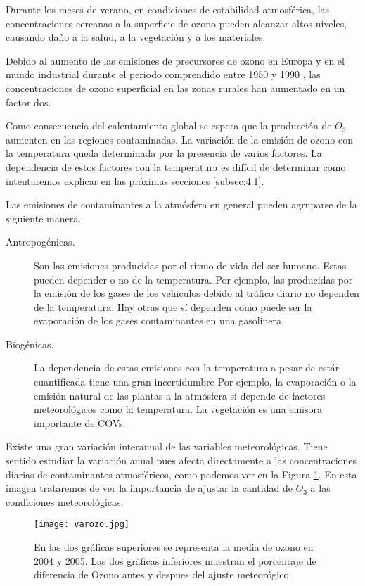 \documentclass[12pt]{article}
\begin{document}
Durante los meses de verano, en condiciones de estabilidad atmosférica, las concentraciones cercanas a la superficie de ozono pueden alcanzar altos niveles, causando daño a la salud, a la vegetación  y a los materiales.

 Debido al  aumento  de las emisiones de  precursores de ozono en Europa y en el mundo industrial durante el periodo comprendido entre 1950 y 1990 \citep{staehelin1994}, las concentraciones de ozono superficial en las zonas rurales han aumentado en un factor dos.
 



Como consecuencia del calentamiento global se espera que la producción de $O_3$ aumenten en las regiones contaminadas. La variación de la emisión de ozono con la temperatura queda determinada por la presencia de  varios factores. La dependencia de estos factores con la temperatura es difícil de determinar como intentaremos explicar en las próximas secciones \ref{subsec:4.1}.


Las emisiones de contaminantes a la atmósfera en general pueden agruparse de la siguiente manera.
\begin{description}
\item[Antropogénicas.] Son las emisiones producidas por el ritmo de vida del ser humano. Estas pueden depender o no de la temperatura. Por ejemplo, las producidas por la emisión de los gases de los vehiculos debido al tráfico diario no dependen de la temperatura. Hay otras que sí dependen como puede ser la evaporación de los gases contaminantes en una gasolinera.
\item[ Biogénicas.] La dependencia de estas emisiones con  la temperatura  a pesar de   estár cuantificada tiene una gran incertidumbre \citep{guenther} Por ejemplo, la  evaporación o la emisión natural de las plantas a la atmósfera sí depende de factores meteorológicos como la temperatura. La vegetación es una emisora importante de  COVs.
\end{description}

Existe una gran variación  interanual de las variables meteorológicas. Tiene sentido estudiar la variación  anual pues afecta directamente a las concentraciones diarias de contaminantes atmosféricos, como podemos ver en la Figura \ref{figura1}. En esta imagen trataremos de ver la importancia de ajustar la cantidad de $O_3$  a las condiciones meteorológicas.%
\begin{figure}[h]
\centering
    \texttt{[image: varozo.jpg]}
    \caption[Diferencia interanual de ozono con y sin ajuste meteorológico]{En las dos gráficas superiores se representa la media de ozono en 2004 y 2005. Las dos gráficas inferiores muestran el porcentaje de diferencia de Ozono  antes y despues del ajuste meteorógico}\label{figura1}
\end{figure}
\end{document}
